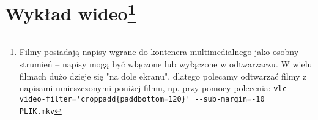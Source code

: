 \section[Wykład wideo]{Wykład wideo\footnote{
	Filmy posiadają napisy wgrane do kontenera multimedialnego jako osobny strumień – napisy mogą być włączone lub wyłączone w odtwarzaczu.
	W wielu filmach dużo dzieje się "na dole ekranu", dlatego polecamy odtwarzać filmy z napisami umieszczonymi poniżej filmu, np. przy pomocy polecenia:
		\Verb$vlc --video-filter='croppadd{paddbottom=120}' --sub-margin=-10  PLIK.mkv$
}}
